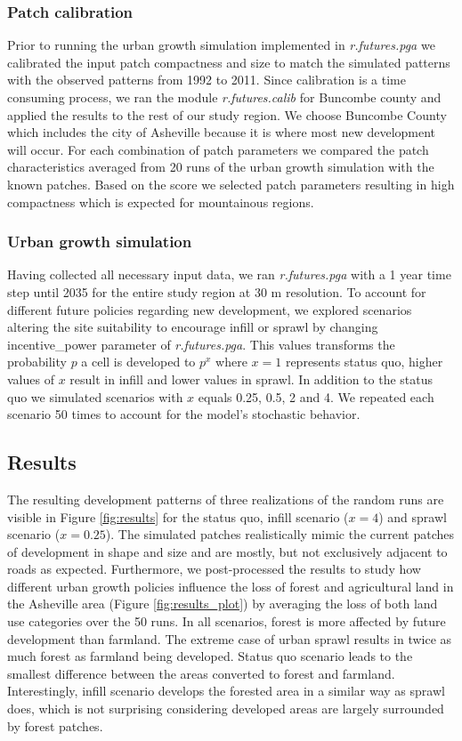 \documentclass{isprs}
\begin{document}
\subsubsection{Patch calibration}
Prior to running the urban growth simulation implemented in \emph{r.futures.pga}
we calibrated the input patch compactness and size to match
the simulated patterns with the observed patterns from 1992 to 2011.
Since calibration is a time consuming process, we ran the module
\emph{r.futures.calib} for Buncombe county 
and applied the results to the rest of our study region.
We choose Buncombe County which includes the city of Asheville  because it is where most new development will occur.
For each combination of patch parameters we compared the patch characteristics 
averaged from 20 runs of the urban growth simulation with the known patches.
Based on the score we selected patch parameters resulting in high compactness
which is expected for mountainous regions.



\subsubsection{Urban growth simulation}
Having collected all necessary input data, we ran 
\emph{r.futures.pga} with a 1 year time step until 2035 for the entire study region at 30 m resolution.
To account for different future policies regarding new development, we explored
scenarios altering the site suitability to encourage infill or sprawl by changing
incentive\_power parameter of \emph{r.futures.pga}. This values transforms
the probability $p$ a cell is developed to $p^x$ where $x = 1$ represents status quo,
higher values of $x$ result in infill and lower values in sprawl.
In addition to the status quo we simulated scenarios with $x$ equals 0.25, 0.5, 2 and 4.
We repeated each scenario 50 times to account for the model's stochastic behavior.



\subsection{Results}
The resulting development patterns of three realizations of the random runs
are visible in Figure \ref{fig:results}
for the status quo, infill scenario ($x = 4$) and sprawl scenario ($x=0.25$).
The simulated patches realistically mimic the current patches of development in shape and size
and are mostly, but not exclusively adjacent to roads as expected.
Furthermore, we post-processed the results to study how different urban growth policies
influence the loss of forest and agricultural land in the Asheville area
(Figure \ref{fig:results_plot})
by averaging the loss of both land use categories over the 50 runs.
In all scenarios, forest is more affected by future development than farmland.
The extreme case of urban sprawl results in twice as much forest as farmland being developed.
Status quo scenario leads to the smallest difference between the areas converted to forest and farmland.
Interestingly, infill scenario develops the forested area in a similar way as sprawl does, which 
is not surprising considering developed areas are largely surrounded by forest patches.
\end{document}
